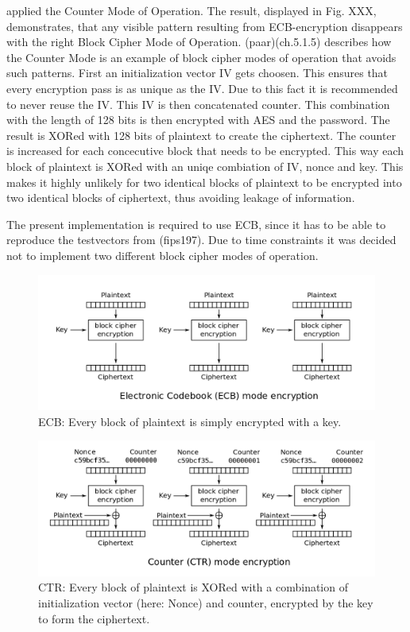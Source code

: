 applied the Counter Mode of Operation. The result, displayed in Fig.
XXX, demonstrates, that any visible pattern resulting from
ECB-encryption disappears with the right Block Cipher Mode of Operation.
(paar)(ch.5.1.5) describes how the Counter Mode is an example of block
cipher modes of operation that avoids such patterns. First an
initialization vector IV gets choosen. This ensures that every
encryption pass is as unique as the IV. Due to this fact it is
recommended to never reuse the IV. This IV is then concatenated counter.
This combination with the length of 128 bits is then encrypted with AES
and the password. The result is XORed with 128 bits of plaintext to
create the ciphertext. The counter is increased for each concecutive
block that needs to be encrypted. This way each block of plaintext is
XORed with an uniqe combiation of IV, nonce and key. This makes it
highly unlikely for two identical blocks of plaintext to be encrypted
into two identical blocks of ciphertext, thus avoiding leakage of
information.

The present implementation is required to use ECB, since it has to be
able to reproduce the testvectors from (fips197). Due to time constraints
it was decided not to implement two different block cipher modes of
operation.

\begin{figure}
\centering
\includegraphics[scale = 0.25]{data/figures/ECB_encryption.png}
\caption{ECB: Every block of plaintext is simply encrypted with a key.}
\end{figure}

\begin{figure}
\centering
\includegraphics[scale = 0.25]{data/figures/CTR_encryption.png}
\caption{CTR: Every block of plaintext is XORed with a combination of initialization vector (here: Nonce) and counter, encrypted by the key to form the ciphertext.}
\end{figure}

